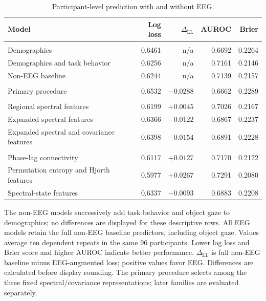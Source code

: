 \begin{table}[!htbp]
\centering\small
\caption{Participant-level prediction with and without EEG.}
\label{tab:performance}
\setlength{\tabcolsep}{4pt}\renewcommand{\arraystretch}{1.14}
\begin{tabularx}{\textwidth}{@{}>{\raggedright\arraybackslash}Xrrrr@{}}
\toprule
Model & Log loss & $\Delta_{\mathrm{LL}}$ & AUROC & Brier\\\midrule
\multicolumn{5}{l}{\textit{Descriptive non-EEG models}}\\
Demographics & 0.6461 & n/a & 0.6692 & 0.2264\\
Demographics and task behavior & 0.6256 & n/a & 0.7161 & 0.2146\\
Non-EEG baseline & 0.6244 & n/a & 0.7139 & 0.2157\\
\midrule\multicolumn{5}{l}{\textit{Primary comparison}}\\
Primary procedure & 0.6532 & $-0.0288$ & 0.6662 & 0.2289\\
\midrule\multicolumn{5}{l}{\textit{Fixed spectral/covariance representations}}\\
Regional spectral features & 0.6199 & $+0.0045$ & 0.7026 & 0.2167\\
Expanded spectral features & 0.6366 & $-0.0122$ & 0.6867 & 0.2237\\
Expanded spectral and covariance features & 0.6398 & $-0.0154$ & 0.6891 & 0.2228\\
\midrule\multicolumn{5}{l}{\textit{Additional representations}}\\
Phase-lag connectivity & 0.6117 & $+0.0127$ & 0.7170 & 0.2122\\
Permutation entropy and Hjorth features & 0.5977 & $+0.0267$ & 0.7291 & 0.2080\\
Spectral-state features & 0.6337 & $-0.0093$ & 0.6883 & 0.2208\\
\bottomrule\end{tabularx}
\par\smallskip\begin{minipage}{\textwidth}\footnotesize The non-EEG models successively add task behavior and object gaze to demographics; no differences are displayed for these descriptive rows. All EEG models retain the full non-EEG baseline predictors, including object gaze. Values average ten dependent repeats in the same 96 participants. Lower log loss and Brier score and higher AUROC indicate better performance. $\Delta_{\mathrm{LL}}$ is full non-EEG baseline minus EEG-augmented loss; positive values favor EEG. Differences are calculated before display rounding. The primary procedure selects among the three fixed spectral/covariance representations; later families are evaluated separately.\end{minipage}
\end{table}


